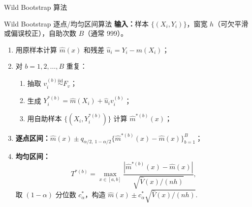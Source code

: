 \documentclass[aspectratio=169, 10pt]{beamer}
\begin{document}
\begin{frame}{Wild Bootstrap 算法}

  \begin{examplebox}{Wild Bootstrap 逐点/均匀区间算法}
    \textbf{输入：}样本 $\{(X_i, Y_i)\}$，窗宽 $h$（可欠平滑或偏误校正），自助次数 $B$（通常 999）。

    \begin{enumerate}
      \item 用原样本计算 $\hat m(x)$ 和残差 $\hat u_i = Y_i - \hat m(X_i)$；
      \item 对 $b = 1, 2, \ldots, B$ 重复：
        \begin{enumerate}
          \item 抽取 $v_i^{(b)}\overset{\text{iid}}{\sim} F_v$；
          \item 生成 $Y_i^{*(b)} = \hat m(X_i) + \hat u_i v_i^{(b)}$；
          \item 用自助样本 $\{(X_i, Y_i^{*(b)})\}$ 计算 $\hat m^{*(b)}(x)$；
        \end{enumerate}
      \item \textbf{逐点区间：}$\hat m(x) \pm q_{\alpha/2,\ 1-\alpha/2}\{\hat m^{*(b)}(x) - \hat m(x)\}_{b=1}^B$；
      \item \textbf{均匀区间：}
        \[
          T^{*(b)} = \max_{x\in[a,b]} \frac{|\hat m^{*(b)}(x) - \hat m(x)|}{\sqrt{\hat V(x)/(nh)}},
        \]
        取 $(1-\alpha)$ 分位数 $c_\alpha^*$，构造
        \(
          \hat m(x) \pm c_\alpha^* \sqrt{\hat V(x)/(nh)}.
        \)
    \end{enumerate}
  \end{examplebox}

\end{frame}
\end{document}
